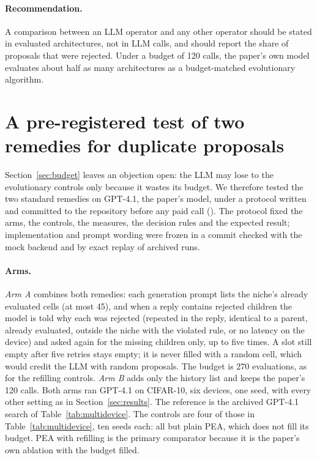 \paragraph{Recommendation.} A comparison between an LLM operator and any other operator should be stated in evaluated architectures, not in LLM calls, and should report the share of proposals that were rejected. Under a budget of 120 calls, the paper's own model evaluates about half as many architectures as a budget-matched evolutionary algorithm.

\section{A pre-registered test of two remedies for duplicate proposals}\label{sec:dupfix}
\noindent Section~\ref{sec:budget} leaves an objection open: the LLM may lose to the evolutionary controls only because it wastes its budget. We therefore tested the two standard remedies on GPT-4.1, the paper's model, under a protocol written and committed to the repository before any paid call (). The protocol fixed the arms, the controls, the measures, the decision rules and the expected result; implementation and prompt wording were frozen in a commit checked with the mock backend and by exact replay of archived runs.

\paragraph{Arms.} \emph{Arm A} combines both remedies: each generation prompt lists the niche's already evaluated cells (at most 45), and when a reply contains rejected children the model is told why each was rejected (repeated in the reply, identical to a parent, already evaluated, outside the niche with the violated rule, or no latency on the device) and asked again for the missing children only, up to five times. A slot still empty after five retries stays empty; it is never filled with a random cell, which would credit the LLM with random proposals. The budget is 270 evaluations, as for the refilling controls. \emph{Arm B} adds only the history list and keeps the paper's 120 calls. Both arms ran GPT-4.1 on CIFAR-10, six devices, one seed, with every other setting as in Section~\ref{sec:results}. The reference is the archived GPT-4.1 search of Table~\ref{tab:multidevice}. The controls are four of those in Table~\ref{tab:multidevice}, ten seeds each: all but plain PEA, which does not fill its budget. PEA with refilling is the primary comparator because it is the paper's own ablation with the budget filled.

